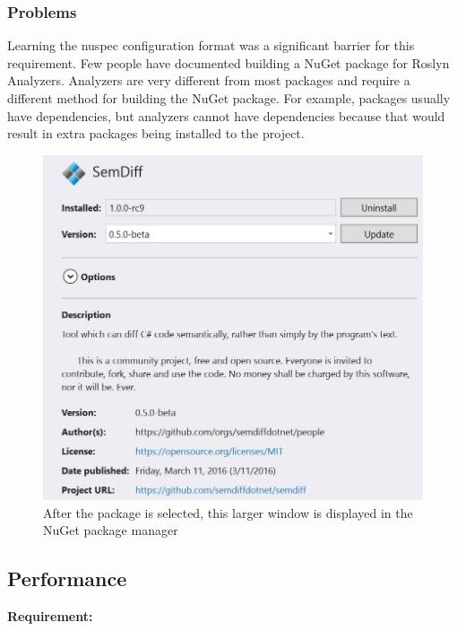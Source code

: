 \documentclass[draftclsnofoot,onecolumn]{IEEEtran}
\begin{document}
\subsubsection{Problems}

Learning the nuspec configuration format was a significant barrier for this requirement. Few people have documented building a NuGet package for Roslyn Analyzers. Analyzers are very different from most packages and require a different method for building the NuGet package. For example, packages usually have dependencies, but analyzers cannot have dependencies because that would result in extra packages being installed to the project.

\begin{figure}[!h]
\centering
\includegraphics[scale=.4]{SemDiffInPackageManager}
\caption{After the package is selected, this larger window is displayed in the NuGet package manager}
\label{pacman}
\end{figure}

\subsection{Performance}%

\textbf{Requirement:}
\end{document}
